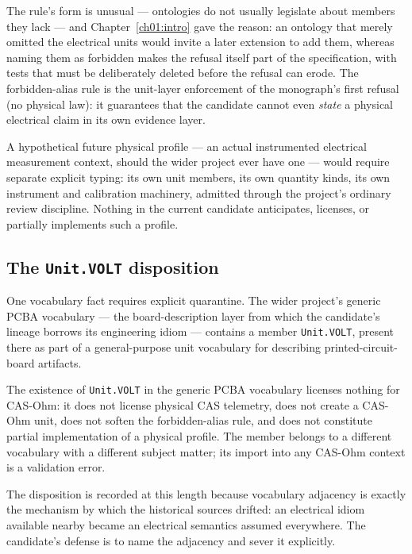 The rule's form is unusual --- ontologies do not usually legislate about members they lack --- and Chapter~\ref{ch01:intro} gave the reason: an ontology that merely omitted the electrical units would invite a later extension to add them, whereas naming them as forbidden makes the refusal itself part of the specification, with tests that must be deliberately deleted before the refusal can erode. The forbidden-alias rule is the unit-layer enforcement of the monograph's first refusal (no physical law): it guarantees that the candidate cannot even \emph{state} a physical electrical claim in its own evidence layer.

A hypothetical future physical profile --- an actual instrumented electrical measurement context, should the wider project ever have one --- would require separate explicit typing: its own unit members, its own quantity kinds, its own instrument and calibration machinery, admitted through the project's ordinary review discipline. Nothing in the current candidate anticipates, licenses, or partially implements such a profile.

\subsection{The \texttt{Unit.VOLT} disposition}\label{ch03:units:unitvolt}

One vocabulary fact requires explicit quarantine. The wider project's generic PCBA vocabulary --- the board-description layer from which the candidate's lineage borrows its engineering idiom --- contains a member \texttt{Unit.VOLT}, present there as part of a general-purpose unit vocabulary for describing printed-circuit-board artifacts.

\begin{ruleenv}\label{ch03:rule:unitvolt}
The existence of \texttt{Unit.VOLT} in the generic PCBA vocabulary licenses nothing for CAS-Ohm: it does not license physical CAS telemetry, does not create a CAS-Ohm unit, does not soften the forbidden-alias rule, and does not constitute partial implementation of a physical profile. The member belongs to a different vocabulary with a different subject matter; its import into any CAS-Ohm context is a validation error.
\end{ruleenv}

The disposition is recorded at this length because vocabulary adjacency is exactly the mechanism by which the historical sources drifted: an electrical idiom available nearby became an electrical semantics assumed everywhere. The candidate's defense is to name the adjacency and sever it explicitly.

